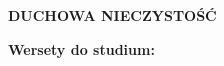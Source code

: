 \documentclass[10pt,a4paper,oneside]{article}
\begin{document}
\centerline{\textbf{\MakeUppercase{Duchowa nieczystość}}}
\begin{center}
\textbf{Wersety do studium:} 

\end{center}
\end{document}

